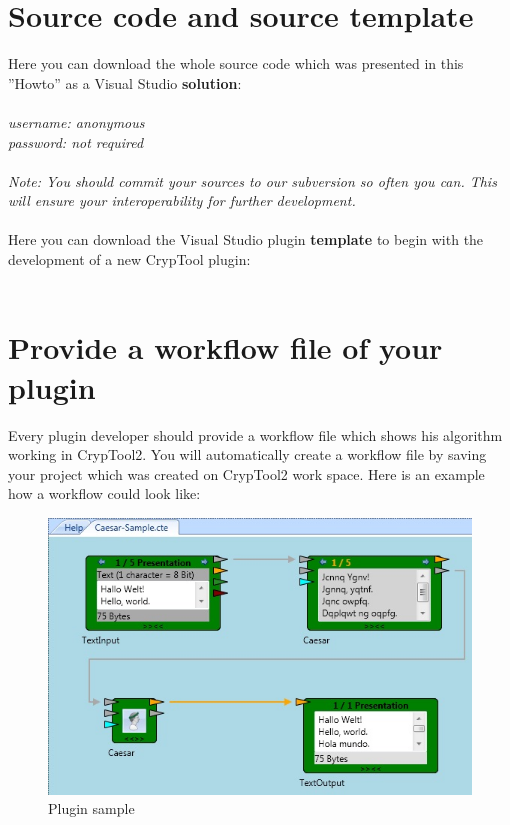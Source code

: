 \section{Source code and source template}\label{sec:SourceCodeAndSourceTemplate}
Here you can download the whole source code which was presented in this ''Howto'' as a Visual Studio \textbf{solution}:\\\\
\textit{username: anonymous\\
password: not required\\}
\\
\textit{\small Note: You should commit your sources to our subversion so often you can. This will ensure your interoperability for further development.}\\\\
Here you can download the Visual Studio plugin \textbf{template} to begin with the development of a new CrypTool plugin:\\\\
\clearpage
\section{Provide a workflow file of your plugin}\label{ProvideAWorkflowFileOfYourPlugin}
Every plugin developer should provide a workflow file which shows his algorithm working in CrypTool2. You will automatically create a workflow file by saving your project which was created on CrypTool2 work space. Here is an example how a workflow could look like:
\begin{figure}[h]
	\centering
		\includegraphics{figures/sample.jpg}
	\caption{Plugin sample}
	\label{fig:sample}
\end{figure} 